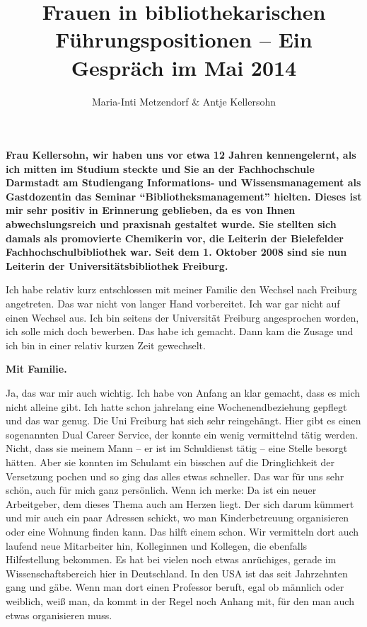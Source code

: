\documentclass[a4paper,
fontsize=11pt,
oneside,
numbers=noperiodatend,
parskip=half-,
bibliography=totoc,
final
]{scrartcl}
\title{\LARGE{Frauen in bibliothekarischen Führungspositionen – Ein Gespräch im Mai 2014}} %
\author{Maria-Inti Metzendorf \& Antje Kellersohn} %
\date{}
\begin{document}
\maketitle
\thispagestyle{fancyplain} 


\textbf{Frau Kellersohn, wir haben uns vor etwa 12 Jahren kennengelernt,
als ich mitten im Studium steckte und Sie an der Fachhochschule
Darmstadt am Studiengang Informations- und Wissensmanagement als
Gastdozentin das Seminar \enquote{Bibliotheksmanagement} hielten. Dieses
ist mir sehr positiv in Erinnerung geblieben, da es von Ihnen
abwechslungsreich und praxisnah gestaltet wurde. Sie stellten sich
damals als promovierte Chemikerin vor, die Leiterin der Bielefelder
Fachhochschulbibliothek war. Seit dem 1. Oktober 2008 sind sie nun
Leiterin der Universitätsbibliothek Freiburg.}

Ich habe relativ kurz entschlossen mit meiner Familie den Wechsel nach
Freiburg angetreten. Das war nicht von langer Hand vorbereitet. Ich war
gar nicht auf einen Wechsel aus. Ich bin seitens der Universität
Freiburg angesprochen worden, ich solle mich doch bewerben. Das habe ich
gemacht. Dann kam die Zusage und ich bin in einer relativ kurzen Zeit
gewechselt.

\textbf{Mit Familie.}

Ja, das war mir auch wichtig. Ich habe von Anfang an klar gemacht, dass
es mich nicht alleine gibt. Ich hatte schon jahrelang eine
Wochenendbeziehung gepflegt und das war genug. Die Uni Freiburg hat sich
sehr reingehängt. Hier gibt es einen sogenannten Dual Career Service,
der konnte ein wenig vermittelnd tätig werden. Nicht, dass sie meinem
Mann -- er ist im Schuldienst tätig -- eine Stelle besorgt hätten. Aber
sie konnten im Schulamt ein bisschen auf die Dringlichkeit der
Versetzung pochen und so ging das alles etwas schneller. Das war für uns
sehr schön, auch für mich ganz persönlich. Wenn ich merke: Da ist ein
neuer Arbeitgeber, dem dieses Thema auch am Herzen liegt. Der sich darum
kümmert und mir auch ein paar Adressen schickt, wo man Kinderbetreuung
organisieren oder eine Wohnung finden kann. Das hilft einem schon. Wir
vermitteln dort auch laufend neue Mitarbeiter hin, Kolleginnen und
Kollegen, die ebenfalls Hilfestellung bekommen. Es hat bei vielen noch
etwas anrüchiges, gerade im Wissenschaftsbereich hier in Deutschland. In
den USA ist das seit Jahrzehnten gang und gäbe. Wenn man dort einen
Professor beruft, egal ob männlich oder weiblich, weiß man, da kommt in
der Regel noch Anhang mit, für den man auch etwas organisieren muss.
\end{document}
